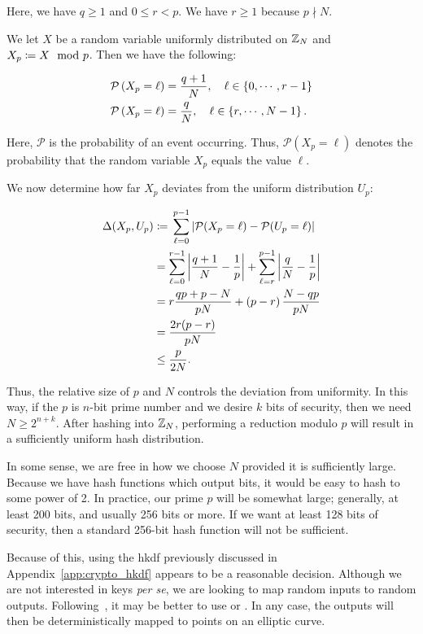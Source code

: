 \noindent
Here, we have $q\ge1$ and $0\le r < p$.
We have $r\ge1$ because $p\nmid N$.

We let $X$ be a random variable uniformly distributed on $\mathbb{Z}_{N}$
and $X_{p} \coloneqq{} X \mod p$.
Then we have the following:

\begin{align}
    \mathcal{P}\left( X_{p} = \ell \right) &= \frac{q+1}{N},
        \quad \ell\in \left\{ 0,\cdots,r-1 \right\} \nonumber\\
    \mathcal{P}\left( X_{p} = \ell \right) &= \frac{q}{N},
        \quad \ell\in \left\{ r,\cdots,N-1 \right\}.
\end{align}

\noindent
Here, $\mathcal{P}$ is the probability of an event occurring.
Thus, $\mathcal{P}(X_{p} = \ell)$ denotes the probability
that the random variable $X_{p}$ equals the value $\ell$.

We now determine how far $X_{p}$ deviates from the uniform
distribution $U_{p}$:

\begin{align}
    \Delta(X_{p},U_{p}) &\coloneqq{}
    \sum_{\ell=0}^{p-1} \left| \mathcal{P}(X_{p}=\ell) - \mathcal{P}(U_{p}=\ell) \right|
        \nonumber\\
    &= \sum_{\ell=0}^{r-1} \left| \frac{q+1}{N} - \frac{1}{p} \right| +
        \sum_{\ell=r}^{p-1} \left| \frac{q}{N} - \frac{1}{p} \right| \nonumber\\
    &= r\frac{qp + p - N}{pN} + \left( p-r \right)\frac{N-qp}{pN}
        \nonumber\\
    &= \frac{2r(p-r)}{pN}
        \nonumber\\
    &\le \frac{p}{2N}.
\end{align}

\noindent
Thus, the relative size of $p$ and $N$ controls the deviation from uniformity.
In this way, if the $p$ is $n$-bit prime number and we desire
$k$ bits of security,
then we need $N\ge 2^{n+k}$.
After hashing into $\mathbb{Z}_{N}$, performing a reduction modulo $p$
will result in a sufficiently uniform hash distribution.

In some sense, we are free in how we choose $N$ provided it is
sufficiently large.
Because we have \glspl{hash function} which output bits,
it would be easy to hash to some power of 2.
In practice, our prime $p$ will be somewhat large;
generally, at least 200 bits, and usually 256 bits or more.
If we want at least 128 bits of security, then a standard 256-bit
\gls{hash function} will not be sufficient.

Because of this, using the \gls{hkdf} previously discussed in
Appendix~\ref{app:crypto_hkdf} appears to be a reasonable decision.
Although we are not interested in keys \emph{per se},
we are looking to map random inputs
to random outputs.
Following~\cite{rfc9380},
it may be better to use \ExpandMsgXmd{} or \ExpandMsgXof{}.
In any case, the outputs will then be deterministically mapped to points
on an \gls{elliptic curve}.
